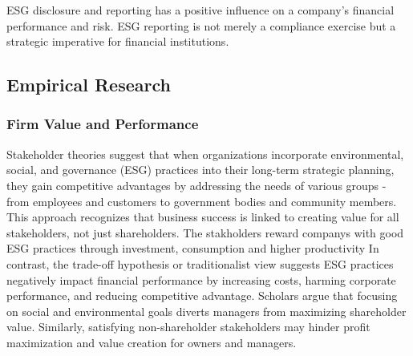 \documentclass[
  authoryear]{elsarticle}
\begin{document}
ESG disclosure and reporting has a positive influence on a company's
financial performance and risk. ESG reporting is not merely a compliance
exercise but a strategic imperative for financial institutions.

\subsection{Empirical Research}\label{empirical-research}

\subsubsection{Firm Value and
Performance}\label{firm-value-and-performance}

Stakeholder theories \citep[see][]{FREEMAN1984, DEEGAN2002} suggest that
when organizations incorporate environmental, social, and governance
(ESG) practices into their long-term strategic planning, they gain
competitive advantages by addressing the needs of various groups - from
employees and customers to government bodies and community members. This
approach recognizes that business success is linked to creating value
for all stakeholders, not just shareholders. The stakholders reward
companys with good ESG practices through investment, consumption and
higher productivity \citep{LI2018}In contrast, the trade-off hypothesis
or traditionalist view \citep[see][]{FRIEDMAN2007} suggests ESG
practices negatively impact financial performance by increasing costs,
harming corporate performance, and reducing competitive advantage.
Scholars argue that focusing on social and environmental goals diverts
managers from maximizing shareholder value. Similarly, satisfying
non-shareholder stakeholders may hinder profit maximization and value
creation for owners and managers\citep{GALANT2017}.
\end{document}
